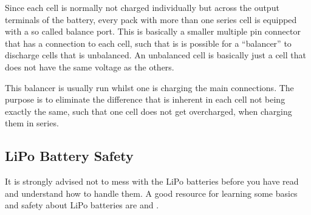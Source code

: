 Since each cell is normally not charged individually but across the
output terminals of the battery, every pack with more than one series
cell is equipped with a so called balance port. This is basically a
smaller multiple pin connector that has a connection to each cell,
such that is is possible for a ``balancer'' to discharge cells that is
unbalanced. An unbalanced cell is basically just a cell that does not
have the same voltage as the others.

This balancer is usually run whilst one is charging the main
connections. The purpose is to eliminate the difference that is
inherent in each cell not being exactly the same, such that one cell
does not get overcharged, when charging them in series.

\subsection{LiPo Battery Safety}
\begin{tcolorbox}[colback=yellow!75!,colframe=red]
It is strongly advised not to mess with the LiPo batteries before you
have read and understand how to handle them. A good resource for
learning some basics and safety about LiPo batteries are
\citep{tjintech:lipo-basics} and \citep{tjintech:lipo-safety}.
\end{tcolorbox}
 
